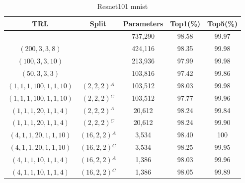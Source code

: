 \documentclass{article}
\begin{document}
	
	\begin{table}
		\centering
		\begin{tabular}{c c c c c}
			\hline
			\textbf{TRL} & \textbf{Split} & \textbf{Parameters} & \textbf{Top1(\%)} & \textbf{Top5(\%)} \\
			\hline
			& & 737,290 & 98.58 & 99.97 \\
			$(200,3,3,8)$ & & 424,116 & 98.35 & 99.98 \\
			$(100,3,3,10)$ & & 213,936 & 97.99 & 99.98 \\
			$(50,3,3,3)$ & & 103,816 & 97.42 & 99.86 \\
			$(1,1,1,100,1,1,10)$ & $(2,2,2)$$^A$ & 103,512 & 98.03 & 99.98 \\
			$(1,1,1,100,1,1,10)$ & $(2,2,2)$$^C$ & 103,512 & 97.77 & 99.96 \\
			$(1,1,1,20,1,1,4)$ & $(2,2,2)$$^A$ & 20,612 & 98.24 & 99.84 \\
			$(1,1,1,20,1,1,4)$ & $(2,2,2)$$^C$ & 20,612 & 98.24 & 99.90 \\
			$(4,1,1,20,1,1,10)$ & $(16,2,2)$$^A$ & 3,534 & 98.40 & 100 \\
			$(4,1,1,20,1,1,10)$ & $(16,2,2)$$^C$ & 3,534 & 98.25 & 99.95 \\
			$(4,1,1,10,1,1,4)$ & $(16,2,2)$$^A$ & 1,386 & 98.03 & 99.96 \\
			$(4,1,1,10,1,1,4)$ & $(16,2,2)$$^C$ & 1,386 & 98.05 & 99.89 \\
			\hline
		\end{tabular}
		\caption{Resnet101 mnist}
		\label{Resnet101 mnist}
	\end{table}
	
\end{document}
